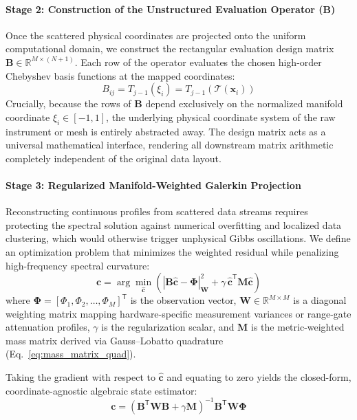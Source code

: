\documentclass[11pt,a4paper]{article}
\begin{document}
\paragraph{Stage 2: Construction of the Unstructured Evaluation Operator ($\mathbf{B}$)}
Once the scattered physical coordinates are projected onto the uniform computational domain, we construct the rectangular evaluation design matrix $\mathbf{B} \in \mathbb{R}^{M \times (N+1)}$. Each row of the operator evaluates the chosen high-order Chebyshev basis functions at the mapped coordinates:
\begin{equation}
B_{ij} = T_{j-1}(\xi_i) = T_{j-1}\left(\mathcal{T}(\mathbf{x}_i)\right)
\label{eq:b_matrix_unstructured}
\end{equation}
Crucially, because the rows of $\mathbf{B}$ depend exclusively on the normalized manifold coordinate $\xi_i \in [-1, 1]$, the underlying physical coordinate system of the raw instrument or mesh is entirely abstracted away. The design matrix acts as a universal mathematical interface, rendering all downstream matrix arithmetic completely independent of the original data layout.

\paragraph{Stage 3: Regularized Manifold-Weighted Galerkin Projection}
Reconstructing continuous profiles from scattered data streams requires protecting the spectral solution against numerical overfitting and localized data clustering, which would otherwise trigger unphysical Gibbs oscillations. We define an optimization problem that minimizes the weighted residual while penalizing high-frequency spectral curvature:
\begin{equation}
\mathbf{c} = \arg\min_{\mathbf{\hat{c}}} \left( \left| \mathbf{B}\mathbf{\hat{c}} - \mathbf{\Phi} \right|_{\mathbf{W}}^2 + \gamma \, \mathbf{\hat{c}}^{\mathsf{T}} \mathbf{M} \mathbf{\hat{c}} \right)
\label{eq:regularized_least_squares}
\end{equation}
where $\mathbf{\Phi} = [\Phi_1, \Phi_2, \dots, \Phi_M]^{\mathsf{T}}$ is the observation vector, $\mathbf{W} \in \mathbb{R}^{M \times M}$ is a diagonal weighting matrix mapping hardware-specific measurement variances or range-gate attenuation profiles, $\gamma$ is the regularization scalar, and $\mathbf{M}$ is the metric-weighted mass matrix derived via Gauss--Lobatto quadrature (Eq.~\ref{eq:mass_matrix_quad}).

Taking the gradient with respect to $\mathbf{\hat{c}}$ and equating to zero yields the closed-form, coordinate-agnostic algebraic state estimator:
\begin{equation}
\mathbf{c} = \left( \mathbf{B}^{\mathsf{T}} \mathbf{W} \mathbf{B} + \gamma \mathbf{M} \right)^{-1} \mathbf{B}^{\mathsf{T}} \mathbf{W} \mathbf{\Phi}
\label{eq:p_vt_closed_form}
\end{equation}
\end{document}
